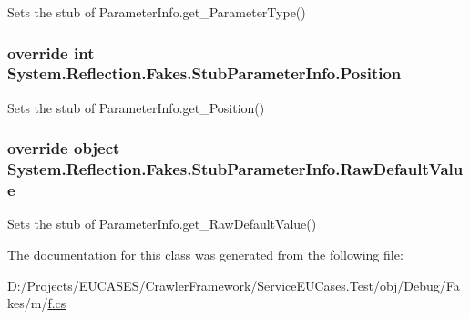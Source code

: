 Sets the stub of Parameter\-Info.\-get\-\_\-\-Parameter\-Type()

\hypertarget{class_system_1_1_reflection_1_1_fakes_1_1_stub_parameter_info_a840c765491161f7f4b01bfe928a136dc}{
\subsubsection[{Position}]{\setlength{\rightskip}{0pt plus 5cm}override int System.\-Reflection.\-Fakes.\-Stub\-Parameter\-Info.\-Position\hspace{0.3cm}{\ttfamily [get]}}}\label{class_system_1_1_reflection_1_1_fakes_1_1_stub_parameter_info_a840c765491161f7f4b01bfe928a136dc}


Sets the stub of Parameter\-Info.\-get\-\_\-\-Position()

\hypertarget{class_system_1_1_reflection_1_1_fakes_1_1_stub_parameter_info_af33f4ecb4dcf145313826377135639bf}{
\subsubsection[{Raw\-Default\-Value}]{\setlength{\rightskip}{0pt plus 5cm}override object System.\-Reflection.\-Fakes.\-Stub\-Parameter\-Info.\-Raw\-Default\-Value\hspace{0.3cm}{\ttfamily [get]}}}\label{class_system_1_1_reflection_1_1_fakes_1_1_stub_parameter_info_af33f4ecb4dcf145313826377135639bf}


Sets the stub of Parameter\-Info.\-get\-\_\-\-Raw\-Default\-Value()



The documentation for this class was generated from the following file\-:\begin{DoxyCompactItemize}
\item 
D\-:/\-Projects/\-E\-U\-C\-A\-S\-E\-S/\-Crawler\-Framework/\-Service\-E\-U\-Cases.\-Test/obj/\-Debug/\-Fakes/m/\hyperlink{m_2f_8cs}{f.\-cs}\end{DoxyCompactItemize}
